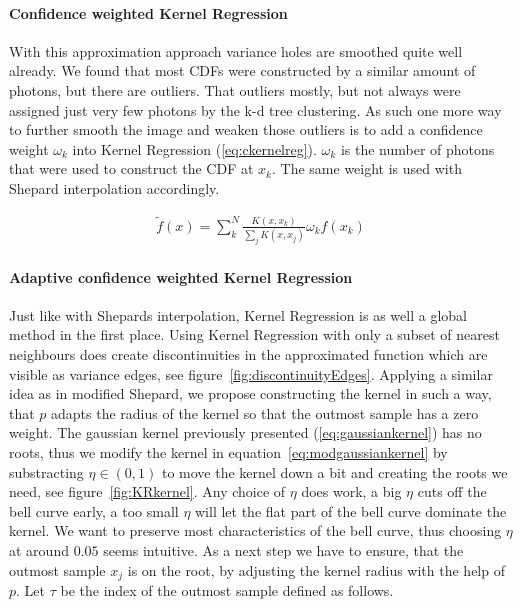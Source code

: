 \paragraph{Confidence weighted Kernel Regression}
\label{ch:ckernelreg}
With this approximation approach variance holes are smoothed quite well already. We found that most CDFs were constructed by a similar amount of photons, but there are outliers. That outliers mostly, but not always were assigned just very few photons by the k-d tree clustering. As such one more way to further smooth the image and weaken those outliers is to add a confidence weight $\omega_k$ into Kernel Regression (\ref{eq:ckernelreg}). $\omega_k$ is the number of photons that were used to construct the CDF at $x_k$. The same weight is used with Shepard interpolation accordingly.

\begin{align}\label{eq:ckernelreg}
\widetilde{f}(x) = \sum_{k}^{N}\frac{K(x,x_k)}{\sum\nolimits_{j}K(x, x_j)}\omega_kf(x_k)
\end{align}

\paragraph{Adaptive confidence weighted Kernel Regression}
Just like with Shepards interpolation, Kernel Regression is as well a global method in the first place. Using Kernel Regression with only a subset of nearest neighbours does create discontinuities in the approximated function which are visible as variance edges, see figure~\ref{fig:discontinuityEdges}. Applying a similar idea as in modified Shepard, we propose constructing the kernel in such a way, that $p$ adapts the radius of the kernel so that the outmost sample has a zero weight. The gaussian kernel previously presented (\ref{eq:gaussiankernel}) has no roots, thus we modify the kernel in equation~\ref{eq:modgaussiankernel} by substracting $\eta \in (0,1)$ to move the kernel down a bit and creating the roots we need, see figure~\ref{fig:KRkernel}. Any choice of $\eta$ does work, a big $\eta$ cuts off the bell curve early, a too small $\eta$ will let the flat part of the bell curve dominate the kernel. We want to preserve most characteristics of the bell curve, thus choosing $\eta$ at around $0.05$ seems intuitive.  As a next step we have to ensure, that the outmost sample $x_j$ is on the root, by adjusting the kernel radius with the help of $p$. Let $\tau$ be the index of the outmost sample defined as follows. 


